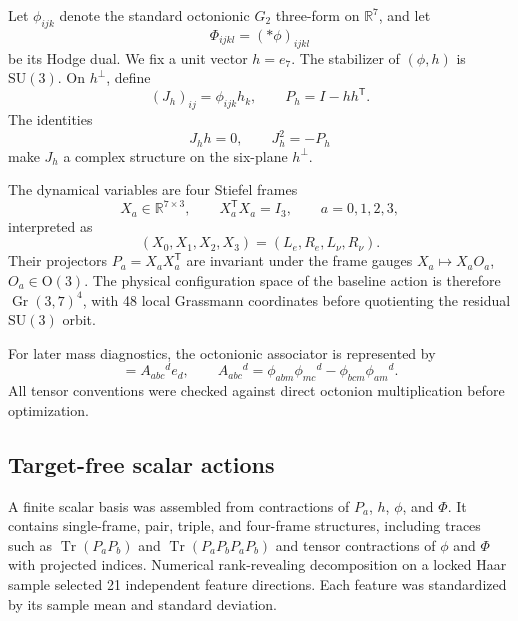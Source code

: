 \documentclass[11pt]{article}
\newcommand{\Gr}{\operatorname{Gr}}
\newcommand{\Tr}{\operatorname{Tr}}
\newcommand{\SU}{\mathrm{SU}}
\newcommand{\OO}{\mathrm{O}}
\begin{document}
Let $\phi_{ijk}$ denote the standard octonionic $G_2$ three-form on $\mathbb R^7$, and let
\begin{equation}
  \Phi_{ijkl}=(*\phi)_{ijkl}
\end{equation}
be its Hodge dual.  We fix a unit vector $h=e_7$.  The stabilizer of $(\phi,h)$ is $\SU(3)$.  On $h^\perp$, define
\begin{equation}
  (J_h)_{ij}=\phi_{ijk}h_k,\qquad
  P_h=I-hh^{\mathsf T}.
  \label{eq:Jh}
\end{equation}
The identities
\begin{equation}
  J_h h=0,\qquad J_h^2=-P_h
  \label{eq:complex-identity}
\end{equation}
make $J_h$ a complex structure on the six-plane $h^\perp$.

The dynamical variables are four Stiefel frames
\begin{equation}
  X_a\in\mathbb R^{7\times 3},\qquad X_a^{\mathsf T}X_a=I_3,
  \qquad a=0,1,2,3,
\end{equation}
interpreted as
\begin{equation}
  (X_0,X_1,X_2,X_3)=(L_e,R_e,L_\nu,R_\nu).
\end{equation}
Their projectors $P_a=X_aX_a^{\mathsf T}$ are invariant under the frame gauges $X_a\mapsto X_aO_a$, $O_a\in\OO(3)$.  The physical configuration space of the baseline action is therefore $\Gr(3,7)^4$, with 48 local Grassmann coordinates before quotienting the residual $\SU(3)$ orbit.

For later mass diagnostics, the octonionic associator is represented by
\begin{equation}
  [e_a,e_b,e_c]=A_{abc}{}^d e_d,
  \qquad
  A_{abc}{}^d
  =\phi_{abm}\phi_{mc}{}^d-\phi_{bcm}\phi_{am}{}^d.
  \label{eq:associator}
\end{equation}
All tensor conventions were checked against direct octonion multiplication before optimization.

\subsection{Target-free scalar actions}

A finite scalar basis was assembled from contractions of $P_a$, $h$, $\phi$, and $\Phi$.  It contains single-frame, pair, triple, and four-frame structures, including traces such as $\Tr(P_aP_b)$ and $\Tr(P_aP_bP_aP_b)$ and tensor contractions of $\phi$ and $\Phi$ with projected indices.  Numerical rank-revealing decomposition on a locked Haar sample selected 21 independent feature directions.  Each feature was standardized by its sample mean and standard deviation.
\end{document}

